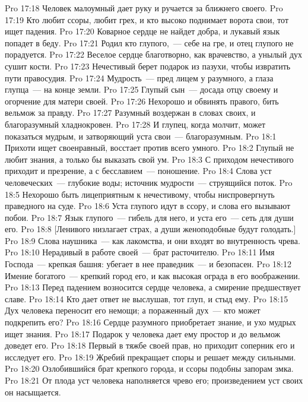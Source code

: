 \vs Pro 17:18 Человек малоумный дает руку и ручается за ближнего своего.
\vs Pro 17:19 Кто любит ссоры, любит грех, и кто высоко поднимает ворота свои, тот ищет падения.
\vs Pro 17:20 Коварное сердце не найдет добра, и лукавый язык попадет в беду.
\vs Pro 17:21 Родил кто глупого,~--- себе на гре, и отец глупого не порадуется.
\vs Pro 17:22 Веселое сердце благотворно, как врачевство, а унылый дух сушит кости.
\vs Pro 17:23 Нечестивый берет подарок из пазухи, чтобы извратить пути правосудия.
\vs Pro 17:24 Мудрость~--- пред лицем у разумного, а глаза глупца~--- на конце земли.
\vs Pro 17:25 Глупый сын~--- досада отцу своему и огорчение для матери своей.
\vs Pro 17:26 Нехорошо и обвинять правого,  бить вельмож за правду.
\vs Pro 17:27 Разумный воздержан в словах своих, и благоразумный хладнокровен.
\vs Pro 17:28 И глупец, когда молчит, может показаться мудрым, и затворяющий уста свои~--- благоразумным.
\vs Pro 18:1 Прихоти ищет своенравный, восстает против всего умного.
\vs Pro 18:2 Глупый не любит знания, а только бы выказать свой ум.
\vs Pro 18:3 С приходом нечестивого приходит и презрение, а с бесславием~--- поношение.
\vs Pro 18:4 Слова уст человеческих~--- глубокие воды; источник мудрости~--- струящийся поток.
\vs Pro 18:5 Нехорошо быть лицеприятным к нечестивому, чтобы ниспровергнуть праведного на суде.
\vs Pro 18:6 Уста глупого идут в ссору, и слова его вызывают побои.
\vs Pro 18:7 Язык глупого~--- гибель для него, и уста его~--- сеть для души его.
\vs Pro 18:8 [Ленивого низлагает страх, а души женоподобные будут голодать.]
\vs Pro 18:9 Слова наушника~--- как лакомства, и они входят во внутренность чрева.
\vs Pro 18:10 Нерадивый в работе своей~--- брат расточителю.
\vs Pro 18:11 Имя Господа~--- крепкая башня: убегает в нее праведник~--- и безопасен.
\vs Pro 18:12 Имение богатого~--- крепкий город его, и как высокая ограда в его воображении.
\vs Pro 18:13 Перед падением возносится сердце человека, а смирение предшествует славе.
\vs Pro 18:14 Кто дает ответ не выслушав, тот глуп, и стыд ему.
\vs Pro 18:15 Дух человека переносит его немощи; а пораженный дух~--- кто может подкрепить его?
\vs Pro 18:16 Сердце разумного приобретает знание, и ухо мудрых ищет знания.
\vs Pro 18:17 Подарок у человека дает ему простор и до вельмож доведет его.
\vs Pro 18:18 Первый в тяжбе своей прав, но приходит соперник его и исследует его.
\vs Pro 18:19 Жребий прекращает споры и решает между сильными.
\vs Pro 18:20 Озлобившийся брат  крепкого города, и ссоры подобны запорам змка.
\vs Pro 18:21 От плода уст человека наполняется чрево его; произведением уст своих он насыщается.
